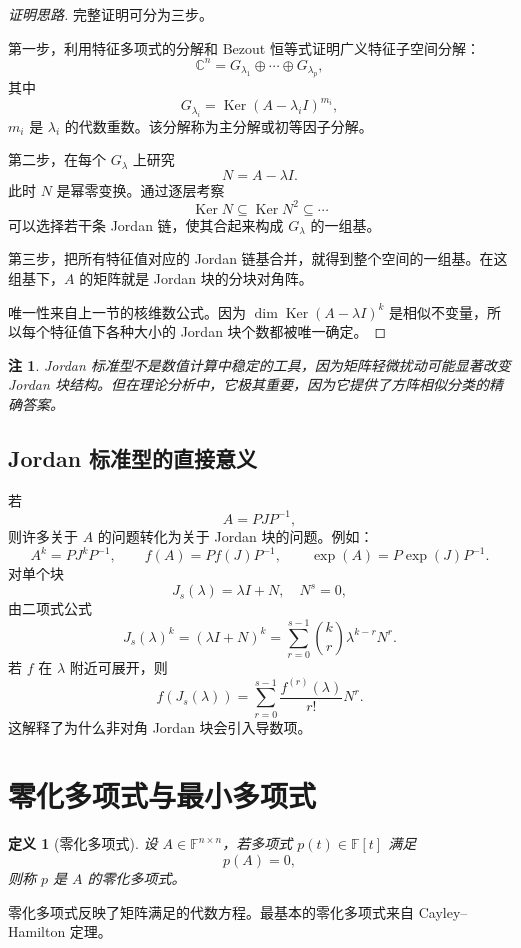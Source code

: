 \documentclass[UTF8,openany,zihao=-4]{ctexbook}
\theoremstyle{cnplain}
\newtheorem{definition}{定义}[chapter]
\newtheorem{remark}{注}[chapter]
\newcommand{\F}{\mathbb F}
\newcommand{\C}{\mathbb C}
\newcommand{\Ker}{\operatorname{Ker}}
\begin{document}
\begin{proof}[证明思路]
完整证明可分为三步。

第一步，利用特征多项式的分解和 Bezout 恒等式证明广义特征子空间分解：
\[
\C^n=G_{\lambda_1}\oplus\cdots\oplus G_{\lambda_p},
\]
其中
\[
G_{\lambda_i}=\Ker(A-\lambda_i I)^{m_i},
\]
$m_i$ 是 $\lambda_i$ 的代数重数。该分解称为主分解或初等因子分解。

第二步，在每个 $G_\lambda$ 上研究
\[
N=A-\lambda I.
\]
此时 $N$ 是幂零变换。通过逐层考察
\[
\Ker N\subseteq\Ker N^2\subseteq\cdots
\]
可以选择若干条 Jordan 链，使其合起来构成 $G_\lambda$ 的一组基。

第三步，把所有特征值对应的 Jordan 链基合并，就得到整个空间的一组基。在这组基下，$A$ 的矩阵就是 Jordan 块的分块对角阵。

唯一性来自上一节的核维数公式。因为 $\dim\Ker(A-\lambda I)^k$ 是相似不变量，所以每个特征值下各种大小的 Jordan 块个数都被唯一确定。
\end{proof}

\begin{remark}
Jordan 标准型不是数值计算中稳定的工具，因为矩阵轻微扰动可能显著改变 Jordan 块结构。但在理论分析中，它极其重要，因为它提供了方阵相似分类的精确答案。
\end{remark}

\subsection{Jordan 标准型的直接意义}

若
\[
A=PJP^{-1},
\]
则许多关于 $A$ 的问题转化为关于 Jordan 块的问题。例如：
\[
A^k=PJ^kP^{-1},
\qquad
f(A)=Pf(J)P^{-1},
\qquad
\exp(A)=P\exp(J)P^{-1}.
\]
对单个块
\[
J_s(\lambda)=\lambda I+N,
\quad N^s=0,
\]
由二项式公式
\[
J_s(\lambda)^k=(\lambda I+N)^k
=\sum_{r=0}^{s-1}\binom{k}{r}\lambda^{k-r}N^r.
\]
若 $f$ 在 $\lambda$ 附近可展开，则
\[
f(J_s(\lambda))=
\sum_{r=0}^{s-1}\frac{f^{(r)}(\lambda)}{r!}N^r.
\]
这解释了为什么非对角 Jordan 块会引入导数项。

\section{零化多项式与最小多项式}

\begin{definition}[零化多项式]
设 $A\in\F^{n\times n}$，若多项式 $p(t)\in\F[t]$ 满足
\[
p(A)=0,
\]
则称 $p$ 是 $A$ 的零化多项式。
\end{definition}

零化多项式反映了矩阵满足的代数方程。最基本的零化多项式来自 Cayley--Hamilton 定理。
\end{document}
